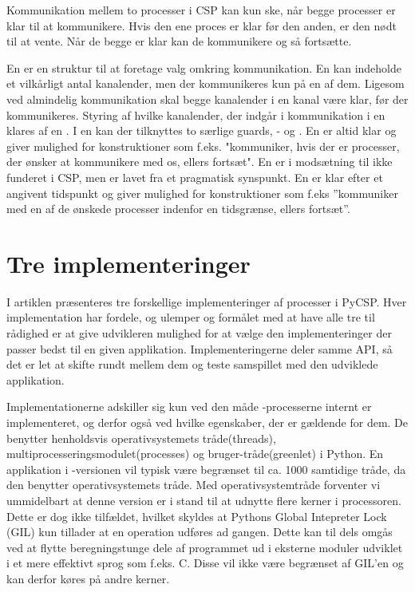 Kommunikation mellem to processer i CSP kan kun ske, når begge processer er klar til at kommunikere. Hvis den ene proces er klar før den anden, er den nødt til at vente. Når de begge er klar kan de kommunikere og så fortsætte.

En  er en struktur til at foretage valg omkring kommunikation. En  kan indeholde et vilkårligt antal kanalender, men der kommunikeres kun på en af dem. Ligesom ved almindelig kommunikation skal begge kanalender i en kanal være klar, før der kommunikeres. Styring af hvilke kanalender, der indgår i kommunikation i en   klares af en . I en  kan der tilknyttes to særlige guards, - og . En  er altid klar og giver mulighed for konstruktioner som f.eks. "kommuniker, hvis der er processer, der ønsker at kommunikere med os, ellers fortsæt". En  er i modsætning til  ikke funderet i CSP, men er lavet fra et pragmatisk synspunkt. En  er klar efter et angivent tidspunkt og giver mulighed for konstruktioner som f.eks ''kommuniker med en af de ønskede processer indenfor en tidsgrænse, ellers fortsæt''. 

\section{Tre implementeringer}
I artiklen \cite{Friborg2009} præsenteres tre forskellige implementeringer af processer i PyCSP. Hver implementation har fordele, og ulemper og formålet med at have alle tre til rådighed er at give udvikleren mulighed for at vælge den implementeringer der passer bedst til en given applikation. Implementeringerne deler samme API, så det er let at skifte rundt mellem dem og teste samspillet med den udviklede applikation. 

Implementationerne adskiller sig kun ved den måde \csp-processerne internt er implementeret, og derfor også ved hvilke egenskaber, der er gældende for dem. De benytter henholdsvis operativsystemets tråde(threads), multiprocesseringsmodulet(processes) og bruger-tråde(greenlet) i Python. En applikation i -versionen vil typisk være begrænset til ca. 1000 samtidige tråde, da den benytter operativsystemets tråde\cite[3]{Friborg2009}. Med operativsystemtråde forventer vi ummidelbart at denne version er i stand til at udnytte flere kerner i processoren. Dette er dog ikke tilfældet, hvilket skyldes at Pythons Global Intepreter Lock (GIL) kun tillader at en operation udføres ad gangen. Dette kan til dels omgås ved at flytte beregningstunge dele af programmet ud i eksterne moduler udviklet i et mere effektivt sprog som f.eks. C. Disse vil ikke være begrænset af GIL'en og kan derfor køres på andre kerner. 

